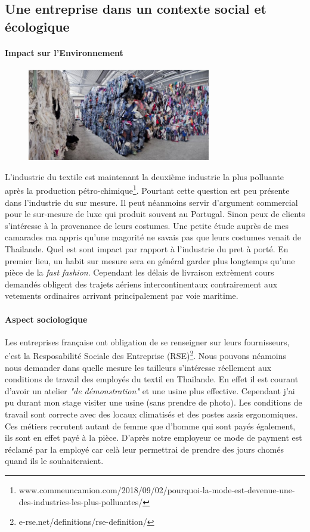 \subsection{Une entreprise dans un contexte social et écologique}
\paragraph{Impact sur l'Environnement}
\begin{figure}
\includegraphics[width=8cm]{image/recyclage.jpg}
\end{figure}
L'industrie du textile est maintenant la deuxième industrie la plus polluante après la production pétro-chimique\footnote{www.commeuncamion.com/2018/09/02/pourquoi-la-mode-est-devenue-une-des-industries-les-plus-polluantes/}. Pourtant cette question est peu présente dans l'industrie du sur mesure. Il peut néanmoins servir d'argument commercial pour le sur-mesure de luxe qui produit souvent au Portugal. Sinon peux de clients s'intéresse à la provenance de leurs costumes. Une petite étude auprès de mes camarades ma appris qu'une magorité ne savais pas que leurs costumes venait de Thailande. Quel est sont impact par rapport à l'industrie du pret à porté. En premier lieu, un habit sur mesure sera en général garder plus longtemps qu'une pièce de la \textit{fast fashion}. Cependant les délais de livraison extrèment cours demandés obligent des trajets aériens intercontinentaux contrairement aux vetements ordinaires arrivant principalement par voie maritime.
\paragraph{Aspect sociologique}
Les entreprises française ont obligation de se renseigner sur leurs fournisseurs, c'est la Resposabilité Sociale des Entreprise (RSE)\footnote{e-rse.net/definitions/rse-definition/}. Nous pouvons néamoins nous demander dans quelle mesure les tailleurs s'intéresse réellement aux conditions de travail des employés du textil en Thailande. En effet il est courant d'avoir un atelier \textit{"de démonstration"} et une usine plus effective. Cependant j'ai pu durant mon stage visiter une usine (sans prendre de photo). Les conditions de travail sont correcte avec des locaux climatisés et des postes assis ergonomiques. Ces métiers recrutent autant de femme que d'homme qui sont payés également, ils sont en effet payé à la pièce. D'après notre employeur ce mode de payment est réclamé par la employé car celà leur permettrai de prendre des jours chomés quand ils le souhaiteraient.
